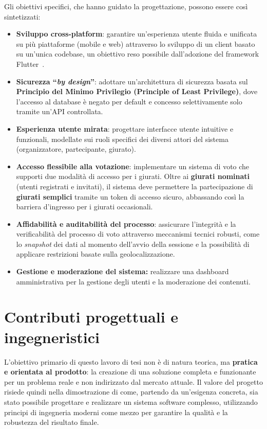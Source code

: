 Gli obiettivi specifici, che hanno guidato la progettazione, possono essere così sintetizzati:
\begin{itemize}
    \item \textbf{Sviluppo cross-platform}: garantire un'esperienza utente fluida e unificata su più piattaforme (mobile e web) attraverso lo sviluppo di un client basato su un'unica codebase, un obiettivo reso possibile dall'adozione del framework Flutter~\cite{flutter_docs}.
    \item \textbf{Sicurezza ``\emph{by design}''}: adottare un'architettura di sicurezza basata sul \textbf{Principio del Minimo Privilegio (Principle of Least Privilege)}, dove l'accesso al database è negato per default e concesso selettivamente solo tramite un'API controllata.
    \item \textbf{Esperienza utente mirata}: progettare interfacce utente intuitive e funzionali, modellate sui ruoli specifici dei diversi attori del sistema (organizzatore, partecipante, giurato).
    \item \textbf{Accesso flessibile alla votazione}: implementare un sistema di voto che supporti due modalità di accesso per i giurati.
    Oltre ai \textbf{giurati nominati} (utenti registrati e invitati), il sistema deve permettere la partecipazione di \textbf{giurati semplici} tramite un token di accesso sicuro, abbassando così la barriera d'ingresso per i giurati occasionali.
    \item \textbf{Affidabilità e auditabilità del processo}: assicurare l'integrità e la verificabilità del processo di voto attraverso meccanismi tecnici robusti, come lo \emph{snapshot} dei dati al momento dell'avvio della sessione e la possibilità di applicare restrizioni basate sulla geolocalizzazione.
    \item \textbf{Gestione e moderazione del sistema:} realizzare una dashboard amministrativa per la gestione degli utenti e la moderazione dei contenuti.
\end{itemize}

\section{Contributi progettuali e ingegneristici}\label{sec:contributi-progettuali-e-ingegneristici}
L'obiettivo primario di questo lavoro di tesi non è di natura teorica, ma \textbf{pratica e orientata al prodotto}: la creazione di una soluzione completa e funzionante per un problema reale e non indirizzato dal mercato attuale.
Il valore del progetto risiede quindi nella dimostrazione di come, partendo da un'esigenza concreta, sia stato possibile progettare e realizzare un sistema software complesso, utilizzando principi di ingegneria moderni come mezzo per garantire la qualità e la robustezza del risultato finale.

